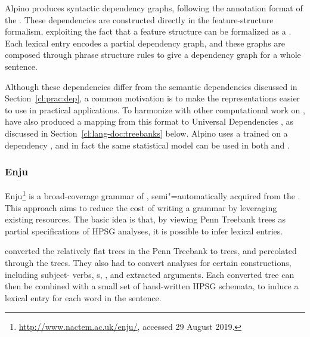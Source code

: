 \documentclass[output=paper
 	        ,biblatex
                ,babelshorthands
                ,newtxmath
                ,draftmode
                ,colorlinks, citecolor=brown
]{langscibook}
\begin{document}
Alpino produces syntactic dependency graphs,
following the annotation format of the  \citep{oostdijk2000corpus}.
These dependencies are constructed directly in the feature-structure formalism,
exploiting the fact that a feature structure can be formalized as a .
Each lexical entry encodes a partial dependency graph,
and these graphs are composed through phrase structure rules
to give a dependency graph for a whole sentence.

Although these dependencies differ from the semantic dependencies discussed in Section~\ref{cl:prac:dep},
a common motivation is to make the representations easier to use in practical applications.
To harmonize with other computational work on ,
\citet{Bou:Van:17} have also produced a mapping from this format
to Universal Dependencies \citep[UD;][]{Niv:Mar:Gin:16},
as discussed in Section~\ref{cl:lang-doc:treebanks} below.
Alpino uses a  trained on a dependency ,
and in fact the same statistical model can be used in both  and 
\citep{dekok2011reversible}.

\subsubsection{Enju}
\label{cl:other:enju}

%
Enju\footnote{%
	\url{http://www.nactem.ac.uk/enju/}, accessed 29 August 2019.
} \citep{MNT2005a-u}
is a broad-coverage grammar of ,
semi"=automatically acquired from the  \citep{Mar:San:Mar:93}.
This approach aims to reduce the cost of writing a grammar
by leveraging existing resources.
The basic idea is that, by viewing Penn Treebank trees as partial specifications of HPSG analyses,
it is possible to infer lexical entries.

\citeauthor{MNT2005a-u} converted the relatively flat trees in the Penn Treebank to  trees,
and percolated  through the trees.
They also had to convert analyses for certain constructions,
including subject- verbs, s, , and extracted arguments.
Each converted tree can then be combined with a small set of hand-written HPSG schemata,
to induce a lexical entry for each word in the sentence.
\end{document}
